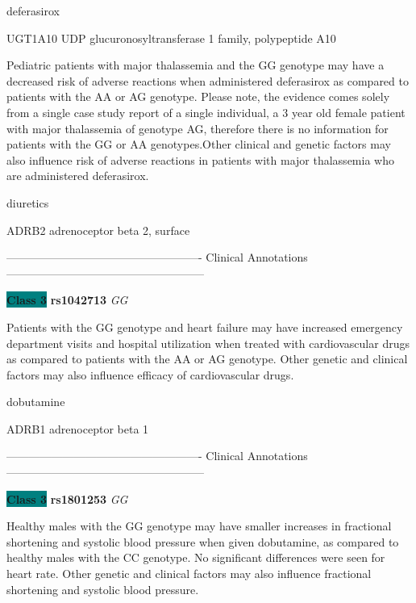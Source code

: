 \documentclass{resume} %
\begin{document}
\begin{rSection}{ deferasirox }
\begin{rSubsection}{ UGT1A10 }{ UDP glucuronosyltransferase 1 family, polypeptide A10 }{}{}
\item[] Pediatric patients with major thalassemia and the GG genotype may have a decreased risk of adverse reactions when administered deferasirox as compared to patients with the AA or AG genotype. Please note, the evidence comes solely from a single case study report of a single individual, a 3 year old female patient with major thalassemia of genotype AG, therefore there is no information for patients with the GG or AA genotypes.Other clinical and genetic factors may also influence risk of adverse reactions in patients with major thalassemia who are administered deferasirox.
\end{rSubsection}

\end{rSection}\begin{rSection}{ diuretics }
\item[]

\begin{rSubsection}{ ADRB2 }{ adrenoceptor beta 2, surface }{}{}
\item[]

\item[] ---------------------------------------------------- Clinical Annotations -----------------------------------------------------\newline
\item \textbf{\colorbox{teal} {Class 3}} \textbf{ rs1042713 } \textit{ GG }
\item[] Patients with the GG genotype and heart failure may have increased emergency department visits and hospital utilization when treated with cardiovascular drugs as compared to patients with the AA or AG genotype. Other genetic and clinical factors may also influence efficacy of cardiovascular drugs.
\end{rSubsection}

\end{rSection}\begin{rSection}{ dobutamine }
\item[]

\begin{rSubsection}{ ADRB1 }{ adrenoceptor beta 1 }{}{}
\item[]

\item[] ---------------------------------------------------- Clinical Annotations -----------------------------------------------------\newline
\item \textbf{\colorbox{teal} {Class 3}} \textbf{ rs1801253 } \textit{ GG }
\item[] Healthy males with the GG genotype may have smaller increases in fractional shortening and systolic blood pressure when given dobutamine, as compared to healthy males with the CC genotype. No significant differences were seen for heart rate. Other genetic and clinical factors may also influence fractional shortening and systolic blood pressure.
\end{rSubsection}


\end{rSection}
\end{document}
